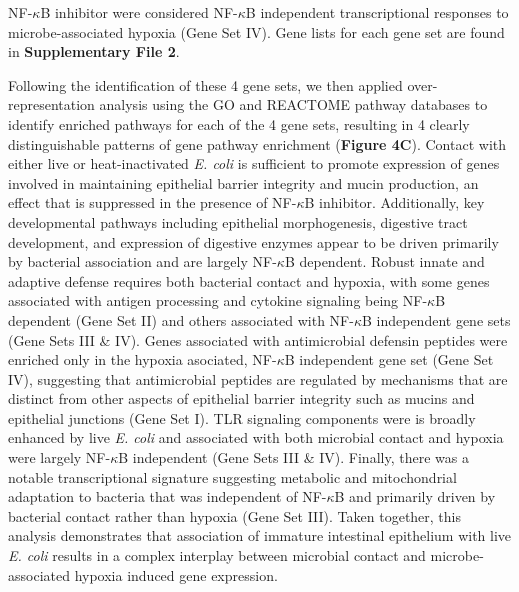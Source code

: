 \documentclass[9pt,lineo]{elife}
\begin{document}
NF-\(\kappa\)B inhibitor were considered NF-\(\kappa\)B independent transcriptional responses to microbe-associated hypoxia (Gene Set IV). Gene lists for each gene set are found in \textbf{Supplementary  File 2}.

Following the identification of these 4 gene sets, we then applied over-representation analysis using the GO and REACTOME pathway databases to identify enriched pathways for each of the 4 gene sets, resulting in 4 clearly distinguishable patterns of gene pathway enrichment (\textbf{Figure 4C}). Contact with either live or heat-inactivated \emph{E. coli} is sufficient to promote expression of genes involved in maintaining epithelial barrier integrity and mucin production, an effect that is suppressed in the presence of NF-\(\kappa\)B inhibitor. Additionally, key developmental pathways including epithelial morphogenesis, digestive tract development, and expression of digestive enzymes appear to be driven primarily by bacterial association and are largely NF-\(\kappa\)B dependent. Robust innate and adaptive defense requires both bacterial contact and hypoxia, with some genes associated with antigen processing and cytokine signaling being NF-\(\kappa\)B dependent (Gene Set II) and others associated with NF-\(\kappa\)B independent gene sets (Gene Sets III \& IV). Genes associated with antimicrobial defensin peptides were enriched only in the hypoxia asociated, NF-\(\kappa\)B independent gene set (Gene Set IV), suggesting that antimicrobial peptides are regulated by mechanisms that are distinct from other aspects of epithelial barrier integrity such as mucins and epithelial junctions (Gene Set I). TLR signaling components were is broadly enhanced by live \emph{E. coli} and associated with both microbial contact and hypoxia were largely NF-\(\kappa\)B independent (Gene Sets III \& IV). Finally, there was a notable transcriptional signature suggesting metabolic and mitochondrial adaptation to bacteria that was independent of NF-\(\kappa\)B and primarily driven by bacterial contact rather than hypoxia (Gene Set III). Taken together, this analysis demonstrates that association of immature intestinal epithelium with live \emph{E. coli} results in a complex interplay between microbial contact and microbe-associated hypoxia induced gene expression. 
\end{document}
